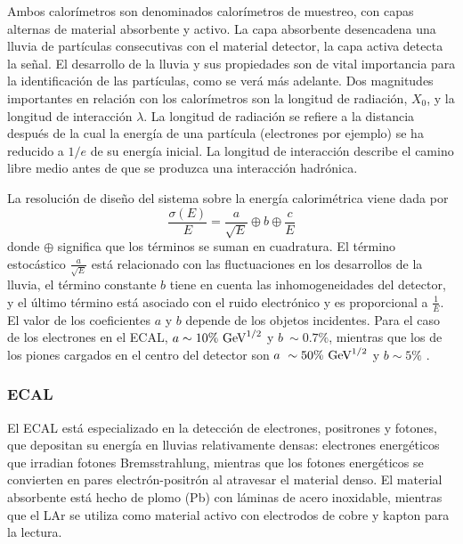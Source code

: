 Ambos calorímetros son denominados calorímetros de muestreo, con capas alternas de material absorbente y activo. La capa absorbente desencadena una lluvia de part\'iculas consecutivas con el material detector, la capa activa detecta la señal.
El desarrollo de la lluvia y sus propiedades son de vital importancia para la identificación de las partículas, como se verá más adelante.
Dos magnitudes importantes en relación con los calorímetros son la longitud de radiación, $X_0$, y la longitud de interacción $\lambda$. La longitud de radiación se refiere a la distancia después de la cual la energía de una partícula (electrones por ejemplo) se ha reducido a \(1/e\) de su energía inicial. La longitud de interacción describe el camino libre medio antes de que se produzca una interacción hadrónica.

La resolución de diseño del sistema sobre la energía calorimétrica viene dada por
\begin{equation}
    \frac{\sigma(E)}{E} = 
    \frac{a}{\sqrt{E}} \oplus b \oplus \frac{c}{E}
\end{equation}
donde \(\oplus\) significa que los términos se suman en cuadratura. El término estocástico \(\frac{a}{\sqrt{E}}\) está relacionado con las fluctuaciones en los desarrollos de la lluvia, el término constante \(b\) tiene en cuenta las inhomogeneidades del detector, y el último término está asociado con el ruido electrónico y es proporcional a \(\frac{1}{E}\). El valor de los coeficientes \(a\) y \(b\) depende de los objetos incidentes. Para el caso de los electrones en el \ac{ECAL}, \(a\sim 10\%~\text{GeV}^{1/2}\) y \(b~\sim 0.7\%\), mientras que los de los piones cargados en el centro del detector son \(a~\sim50\%~\text{GeV}^{1/2}\) y \(b\sim5\%\) \cite{ATLAS-Calorimeters-PerformanceRun2}.



\subsubsection{\acf{ECAL}}
\label{subsubsec:atlas:atlas:cals:ecal}

El \ac{ECAL} está especializado en la detección de electrones, positrones y fotones, que depositan su energía en lluvias relativamente densas: electrones energéticos que irradian fotones Bremsstrahlung, mientras que los fotones energéticos se convierten en pares electrón-positrón al atravesar el material denso.
El material absorbente está hecho de plomo (Pb) con láminas de acero inoxidable, mientras que el \ac{LAr} se utiliza como material activo con electrodos de cobre y kapton para la lectura.


